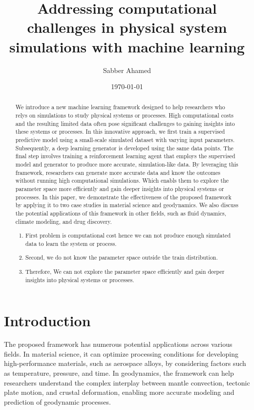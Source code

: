 \documentclass{article}
\title{Addressing computational challenges in physical system simulations with machine learning}
\author{Sabber Ahamed}
\date{\today}
\begin{document}
\maketitle

\begin{abstract}
    \noindent We introduce a new machine learning framework designed to help researchers who relys on simulations to study physical systems or processes. High computational costs and the resulting limited data often pose significant challenges to gaining insights into these systems or processes. In this innovative approach, we first train a supervised predictive model using a small-scale simulated dataset with varying input parameters. Subsequently, a deep learning generator is developed using the same data points. The final step involves training a reinforcement learning agent that employs the supervised model and generator to produce more accurate, simulation-like data. By leveraging this framework, researchers can generate more accurate data and know the outcomes without running high computational simulations. Which enabls them to explore the parameter space more efficiently and gain deeper insights into physical systems or processes. In this paper, we demonstrate the effectiveness of the proposed framework by applying it to two case studies in material science and geodynamics. We also discuss the potential applications of this framework in other fields, such as fluid dynamics, climate modeling, and drug discovery.

    \begin{enumerate}
        \item First problem is computational cost hence we can not produce enough simulated data to learn the system or process.
        \item Second, we do not know the parameter space outside the train distribution.
        \item Therefore, We can not explore the parameter space efficiently and gain deeper insights into physical systems or processes.
    \end{enumerate}
\end{abstract}

\maketitle

\section{Introduction}
The proposed framework has numerous potential applications across various fields. In material science, it can optimize processing conditions for developing high-performance materials, such as aerospace alloys, by considering factors such as temperature, pressure, and time. In geodynamics, the framework can help researchers understand the complex interplay between mantle convection, tectonic plate motion, and crustal deformation, enabling more accurate modeling and prediction of geodynamic processes.
\end{document}
